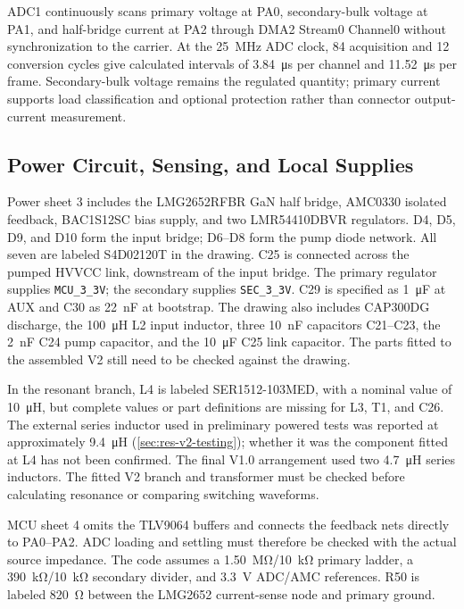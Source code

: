 ADC1 continuously scans primary voltage at PA0, secondary-bulk voltage at PA1, and half-bridge current at PA2 through DMA2 Stream0 Channel0 without synchronization to the carrier. At the \SI{25}{\mega\hertz} ADC clock, 84 acquisition and 12 conversion cycles give calculated intervals of \SI{3.84}{\micro\second} per channel and \SI{11.52}{\micro\second} per frame. Secondary-bulk voltage remains the regulated quantity; primary current supports load classification and optional protection rather than connector output-current measurement.

\subsection{Power Circuit, Sensing, and Local Supplies}

Power sheet 3 includes the LMG2652RFBR GaN half bridge, AMC0330 isolated feedback, BAC1S12SC bias supply, and two LMR54410DBVR regulators. D4, D5, D9, and D10 form the input bridge; D6--D8 form the pump diode network. All seven are labeled S4D02120T in the drawing. C25 is connected across the pumped HVVCC link, downstream of the input bridge. The primary regulator supplies \texttt{MCU\_3\_3V}; the secondary supplies \texttt{SEC\_3\_3V}. C29 is specified as \SI{1}{\micro\farad} at AUX and C30 as \SI{22}{\nano\farad} at bootstrap. The drawing also includes CAP300DG discharge, the \SI{100}{\micro\henry} L2 input inductor, three \SI{10}{\nano\farad} capacitors C21--C23, the \SI{2}{\nano\farad} C24 pump capacitor, and the \SI{10}{\micro\farad} C25 link capacitor. The parts fitted to the assembled V2 still need to be checked against the drawing.

In the resonant branch, L4 is labeled SER1512-103MED, with a nominal value of \SI{10}{\micro\henry}, but complete values or part definitions are missing for L3, T1, and C26. The external series inductor used in preliminary powered tests was reported at approximately \SI{9.4}{\micro\henry} (\cref{sec:res-v2-testing}); whether it was the component fitted at L4 has not been confirmed. The final V1.0 arrangement used two \SI{4.7}{\micro\henry} series inductors. The fitted V2 branch and transformer must be checked before calculating resonance or comparing switching waveforms.

MCU sheet 4 omits the TLV9064 buffers and connects the feedback nets directly to PA0--PA2. ADC loading and settling must therefore be checked with the actual source impedance. The code assumes a \SI{1.50}{\mega\ohm}/\SI{10}{\kilo\ohm} primary ladder, a \SI{390}{\kilo\ohm}/\SI{10}{\kilo\ohm} secondary divider, and \SI{3.3}{\volt} ADC/AMC references. R50 is labeled \SI{820}{\ohm} between the LMG2652 current-sense node and primary ground.

